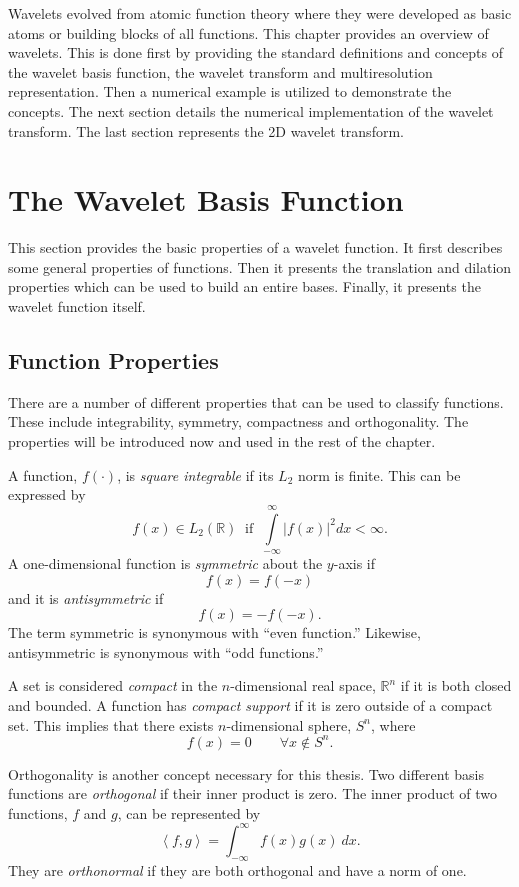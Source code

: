 Wavelets evolved from atomic function theory where they were developed
as basic atoms or building blocks of all functions. This chapter
provides an overview of wavelets. This is done first by providing the
standard definitions and concepts of the wavelet basis function, the
wavelet transform and multiresolution representation. Then a numerical
example is utilized to demonstrate the concepts. The next section
details the numerical implementation of the wavelet transform. The
last section represents the 2D wavelet transform.

\section{The Wavelet Basis Function}

This section provides the basic properties of a wavelet function. It
first describes some general properties of functions. Then it presents
the translation and dilation properties which can be used to build an
entire bases. Finally, it presents the wavelet function itself.

\subsection{Function Properties}

There are a number of different properties that can be used to
classify functions. These include integrability, symmetry, compactness
and orthogonality. The properties will be introduced now and used in
the rest of the chapter.

A function, $f(\cdot)$, is {\it square integrable} if its $L_2$ norm is finite. This can be
expressed by
\[ 
f(x) \in L_2({\mathbb R}) \ \mbox{ if } \ \int\limits _{-\infty}^{\infty} \left|f(x)\right|^2 dx < \infty.
\]
A one-dimensional function is {\it symmetric} about the $y$-axis if 
\[
f(x) = f(-x)
\]
and it is {\it antisymmetric} if
\[
f(x) = -f(-x).
\]
The term symmetric is synonymous with ``even function.''  Likewise, antisymmetric is synonymous with ``odd functions.''

A set is considered {\it compact} in the $n$-dimensional real space,
${\mathbb R}^n$ if it is both closed and bounded. A function has {\it
compact support} if it is zero outside of a compact set. This implies that
there exists $n$-dimensional sphere, $S^n$, where 
\[
f(x) = 0 \qquad \forall x \not \in S^n.
\]

Orthogonality is another concept necessary for this thesis.  Two different basis functions are {\it orthogonal} if their inner product is zero.  The inner product of two functions, $f$ and $g$, can be represented by
\[
\left< f, g \right> = \int_{-\infty}^\infty f(x)g(x) \ dx.
\]
They are {\it orthonormal} if they are both orthogonal and have a norm of one.

